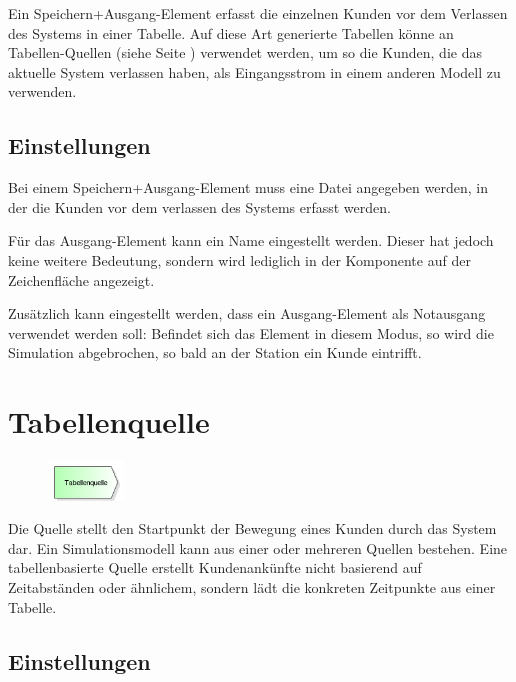 Ein Speichern+Ausgang-Element erfasst die einzelnen Kunden vor dem Verlassen des Systems in einer Tabelle. Auf diese Art
generierte Tabellen könne an Tabellen-Quellen (siehe Seite \pageref{ref:ModelElementSourceTable}) verwendet werden, um so die
Kunden, die das aktuelle System verlassen haben, als Eingangsstrom in einem anderen Modell zu verwenden.

\subsection*{Einstellungen}

Bei einem Speichern+Ausgang-Element muss eine Datei angegeben werden, in der die Kunden vor dem verlassen des Systems erfasst werden.

Für das Ausgang-Element kann ein Name eingestellt werden. Dieser hat jedoch keine weitere Bedeutung, sondern wird lediglich
in der Komponente auf der Zeichenfläche angezeigt.

Zusätzlich kann eingestellt werden, dass ein Ausgang-Element als Notausgang verwendet werden soll: Befindet sich das Element
in diesem Modus, so wird die Simulation abgebrochen, so bald an der Station ein Kunde eintrifft.


\section{Tabellenquelle}
\label{ref:ModelElementSourceTable}

\begin{figure}
\vspace{-22pt}
\includegraphics[width=2cm]{imageModelElementSourceTable.png}
\vspace{-22pt}
\end{figure}

Die Quelle stellt den Startpunkt der Bewegung eines Kunden durch das System dar.
Ein Simulationsmodell kann aus einer oder mehreren Quellen bestehen.
Eine tabellenbasierte Quelle erstellt Kundenankünfte nicht basierend auf
Zeitabständen oder ähnlichem, sondern lädt die konkreten Zeitpunkte aus einer
Tabelle.

\subsection*{Einstellungen}


